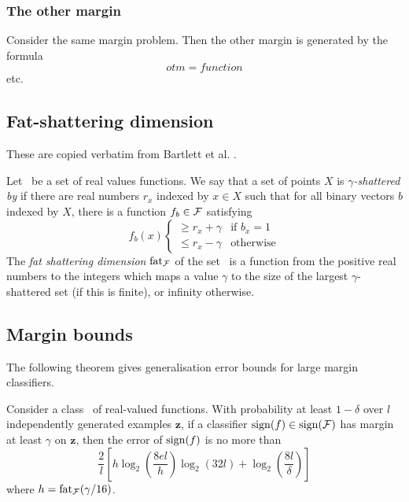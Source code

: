 \subsubsection{The other margin}
Consider the same margin problem.  Then the other margin is generated
by the formula
%
\begin{equation}
otm = function
\end{equation}
%
etc. 


\subsection{Fat-shattering dimension}
These are copied verbatim from Bartlett et al. \cite{Bartlett98a}.

Let \calF\ be a set of real values functions.  We say that a set of
points $X$ is \emph{$\gamma$-shattered by \calF} if there are real
numbers $r_x$ indexed by $x \in X$ such that for all binary vectors
$b$ indexed by $X$, there is a function $f_b \in \mathcal{F}$ satisfying
\begin{equation}
f_b(x)  \left\{
	\begin{array}{ll}
		\geq r_x + \gamma & \mbox{if $b_x = 1$} \\
		\leq r_x - \gamma & \mbox{otherwise}
	\end{array}
\right.
\end{equation}
The \emph{fat shattering dimension} $\mathrm{fat}_{\mathcal{F}}$ of the set \calF\ is
a function from the positive real numbers to the integers which maps a
value $\gamma$ to the size of the largest $\gamma$-shattered set (if
this is finite), or infinity otherwise.


\subsection{Margin bounds}
The following theorem gives generalisation error bounds for large
margin classifiers.

Consider a class \calF\ of real-valued functions.  With probability at
least $1 - \delta$ over $l$ independently generated examples
$\mathbf{z}$, if a classifier $\mathrm{sign} (f) \in \mathrm{sign} (\mathcal{F})$ has margin
at least $\gamma$ on $\mathbf{z}$, then the error of $\mathrm{sign} (f)$ is no
more than
\begin{equation}
\frac{2}{l} \left[ h \log_2 \left( \frac{8 e l}{h} \right) \log_2(32l)
+ \log_2 \left( \frac{8l}{\delta} \right) \right]
\end{equation}
where $h = \mathrm{fat}_{\mathcal{F}}(\gamma / 16)$.

